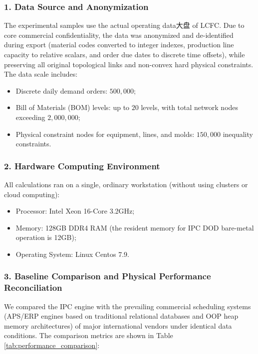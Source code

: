 \documentclass[11pt,a4paper]{article}
\begin{document}
\subsubsection*{1. Data Source and Anonymization}
The experimental samples use the actual operating data大盘 of LCFC. Due to core commercial confidentiality, the data was anonymized and de-identified during export (material codes converted to integer indexes, production line capacity to relative scalars, and order due dates to discrete time offsets), while preserving all original topological links and non-convex hard physical constraints. The data scale includes:
\begin{itemize}
    \item Discrete daily demand orders: $500,000$;
    \item Bill of Materials (BOM) levels: up to $20$ levels, with total network nodes exceeding $2,000,000$;
    \item Physical constraint nodes for equipment, lines, and molds: $150,000$ inequality constraints.
\end{itemize}

\subsubsection*{2. Hardware Computing Environment}
All calculations ran on a single, ordinary workstation (without using clusters or cloud computing):
\begin{itemize}
    \item Processor: Intel Xeon 16-Core 3.2GHz;
    \item Memory: 128GB DDR4 RAM (the resident memory for IPC DOD bare-metal operation is 12GB);
    \item Operating System: Linux Centos 7.9.
\end{itemize}

\subsubsection*{3. Baseline Comparison and Physical Performance Reconciliation}
We compared the IPC engine with the prevailing commercial scheduling systems (APS/ERP engines based on traditional relational databases and OOP heap memory architectures) of major international vendors under identical data conditions. The comparison metrics are shown in Table \ref{tab:performance_comparison}:
\end{document}
